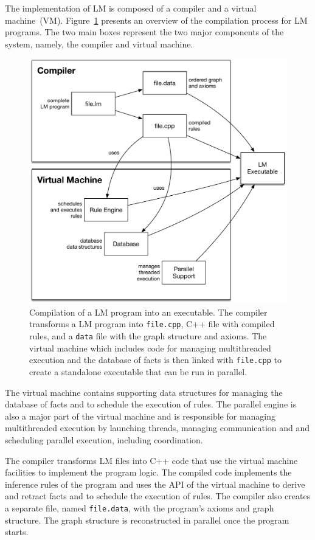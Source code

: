 The implementation of LM is composed of a compiler and a virtual machine~(VM).
Figure~\ref{fig:implementation:overview} presents an overview of the compilation
process for LM programs. The two main boxes represent the two major components
of the system, namely, the compiler and virtual machine.

\begin{figure}
  \centering
  \includegraphics[width=.8\linewidth]{figures/implementation/overview.pdf}
  \caption{Compilation of a LM program into an executable. The compiler
     transforms a LM program into \texttt{file.cpp}, C++ file with compiled
     rules, and a \texttt{data} file with the graph structure and axioms. The virtual
     machine which includes code for managing multithreaded execution and the
     database of facts is then linked with \texttt{file.cpp} to create a
     standalone executable that can be run in parallel.}
  \label{fig:implementation:overview}
\end{figure}

The virtual machine contains supporting data structures for managing the
database of facts and to schedule the execution of rules. The parallel engine is
also a major part of the virtual machine and is responsible for managing
multithreaded execution by launching threads, managing communication and
and scheduling parallel execution, including coordination.

The compiler transforms LM files into C++ code that use the virtual machine
facilities to implement the program logic.  The compiled code implements the
inference rules of the program and uses the API of the virtual machine to derive
and retract facts and to schedule the execution of rules.  The compiler also
creates a separate file, named \texttt{file.data}, with the program's axioms and
graph structure. The graph structure is reconstructed in parallel once the
program starts.

